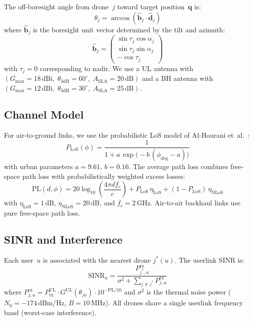 \documentclass[conference]{IEEEtran}
\newcommand{\vect}[1]{\bm{#1}}
\newcommand{\bore}[1]{\hat{\vect{b}}_{#1}}
\newcommand{\dB}{\,\mathrm{dB}}
\newcommand{\dBi}{\,\mathrm{dBi}}
\newcommand{\dBm}{\,\mathrm{dBm}}
\begin{document}
The off-boresight angle from drone~$j$ toward target position~$\vect{q}$ is:
\begin{equation}
\theta_{j} = \arccos\!\left(\bore{j} \cdot \hat{\vect{d}}_{j}\right)
\end{equation}
where $\bore{j}$ is the boresight unit vector determined by the tilt and azimuth:
\begin{equation}
\bore{j} = \begin{pmatrix} \sin\tau_j\cos\alpha_j \\ \sin\tau_j\sin\alpha_j \\ -\cos\tau_j \end{pmatrix}
\end{equation}
with $\tau_j = 0$ corresponding to nadir.
We use a UL antenna with $(G_{\max} = 18\dBi,\; \theta_{3\mathrm{dB}} = 60^\circ,\; A_{\mathrm{SLA}} = 20\dB)$ and a BH antenna with $(G_{\max} = 12\dBi,\; \theta_{3\mathrm{dB}} = 30^\circ,\; A_{\mathrm{SLA}} = 25\dB)$.

\subsection{Channel Model}

For air-to-ground links, we use the probabilistic LoS model of Al-Hourani et~al.~\cite{alhourani2014}:
\begin{equation}
P_{\mathrm{LoS}}(\phi) = \frac{1}{1 + a\,\exp\!\big(-b\,(\phi_{\mathrm{deg}} - a)\big)}
\end{equation}
with urban parameters $a = 9.61$, $b = 0.16$.
The average path loss combines free-space path loss with probabilistically weighted excess losses:
\begin{equation}
\mathrm{PL}(d, \phi) = 20\log_{10}\!\left(\frac{4\pi d f_c}{c}\right) + P_{\mathrm{LoS}}\,\eta_{\mathrm{LoS}} + (1 - P_{\mathrm{LoS}})\,\eta_{\mathrm{NLoS}}
\end{equation}
with $\eta_{\mathrm{LoS}} = 1\dB$, $\eta_{\mathrm{NLoS}} = 20\dB$, and $f_c = 2$\,GHz.
Air-to-air backhaul links use pure free-space path loss.

\subsection{SINR and Interference}

Each user~$u$ is associated with the nearest drone $j^*(u)$.
The userlink SINR is:
\begin{equation}
\mathrm{SINR}_u = \frac{P_{j^*,u}^{\mathrm{rx}}}{\sigma^2 + \sum_{j \neq j^*} P_{j,u}^{\mathrm{rx}}}
\end{equation}
where $P_{j,u}^{\mathrm{rx}} = P_{\mathrm{tx}}^{\mathrm{UL}} \cdot G^{\mathrm{UL}}(\theta_{ju}) \cdot 10^{-\mathrm{PL}/10}$ and $\sigma^2$ is the thermal noise power ($N_0 = -174\dBm$/Hz, $B = 10$\,MHz).
All drones share a single userlink frequency band (worst-case interference).
\end{document}
